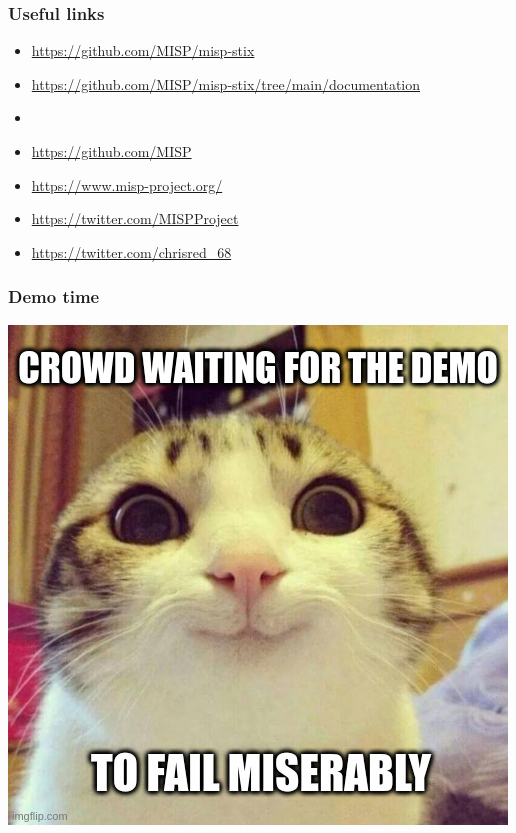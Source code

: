 \begin{frame}
    \frametitle{Useful links}
    \begin{itemize}
        \item \url{https://github.com/MISP/misp-stix}
        \item \url{https://github.com/MISP/misp-stix/tree/main/documentation}
        \item []
        \item \url{https://github.com/MISP}
        \item \url{https://www.misp-project.org/}
        \item \url{https://twitter.com/MISPProject}
        \item \url{https://twitter.com/chrisred_68}
    \end{itemize}
\end{frame}

\begin{frame}
    \frametitle{Demo time}
    \centering
    \includegraphics[scale=0.45]{images/demo.jpg}
\end{frame}
